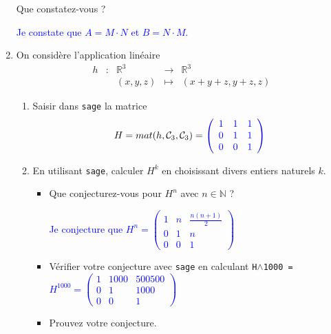 \documentclass[a4paper,12pt]{article}
\def\R{\mathbb{R}}
\def\N{\mathbb{N}}
\newcommand{\add}[1]{\textcolor{blue}{#1}}
\begin{document}
\begin{exercice}
\begin{enumerate}
\begin{itemize}
        \end{itemize}
        Que constatez-vous ? 

        \add{Je constate que $A=M\cdot N$ et $B=N\cdot M$.}
    \item On considère l'application linéaire 
                   $$\begin{array}{ccccc}
                 h & : & \R^3 & \to & \R^3 \\
                  &   & (x,y,z) & \mapsto & (x+y+z, y+z, z)
                     \end{array}$$
           \begin{enumerate}
               \item Saisir dans {\tt sage} la matrice $$H = mat(h,\mathcal C_3,\mathcal C_3) =\add{\left(\begin{array}{ccc} 1 & 1 & 1 \\ 0 & 1 & 1 \\ 0 & 0 & 1\end{array}\right)}$$
               \item En utilisant {\tt sage}, calculer $H^k$ en choisissant divers entiers naturels $k$.
                   \begin{itemize}
                       \item Que conjecturez-vous pour $H^n$ avec $n\in \N$ ?

                            \add{
                                Je conjecture que $H^n=\left(\begin{array}{ccc}1 & n & \frac{n(n+1)}{2}\\ 0 & 1 & n\\ 0 & 0 & 1\end{array}\right)$
                           }
                       \item Vérifier votre conjecture avec {\tt sage} en calculant {\tt H$\mathtt{\wedge}$1000 = } \\

                           \add{
                               $H^{1000}=\left(\begin{array}{ccc}1 & 1000 & 500500 \\ 0 & 1 & 1000 \\ 0 & 0 & 1\end{array}\right)$
                           }
                       \item Prouvez votre conjecture.


\end{itemize}
\end{enumerate}
\end{enumerate}
\end{exercice}
\end{document}

